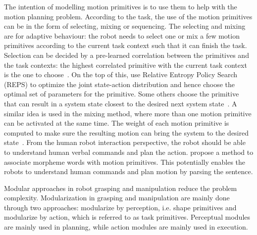 The intention of modelling motion primitives is to use them to help with the motion planning problem. According to the task, the use of the motion primitives can be in the form of selecting, mixing or sequencing. The selecting and mixing are for adaptive behaviour: the robot needs to select one or mix a few motion primitives according to the current task context such that it can finish the task.
Selection can be decided by a pre-learned correlation between the primitives and the task contexts: the highest correlated primitive with the current task context is the one to choose~\citep{takano2006primitive}. On the top of this, \citet{daniel2013learning} use Relative Entropy Policy Search (REPS) to optimize the joint state-action distribution and hence choose the optimal set of parameters for the primitive.
Some others choose the primitive that can result in a system state closest to the desired next system state~\citep{hauser2008using}. A similar idea is used in the mixing method, where more than one motion primitive can be activated at the same time. The weight of each motion primitive is computed to make sure the resulting motion can bring the system to the desired state~\citep{bidan2013robio,sugimoto2012emosaic}. From the human robot interaction perspective, the robot should be able to understand human verbal commands and plan the action. \citet{takano2008integrating} propose a method to associate morpheme words with motion primitives. This potentially enables the robots to understand human commands and plan motion by parsing the sentence.






Modular approaches in robot grasping and manipulation reduce the problem complexity. Modularization in grasping and manipulation are mainly done through two approaches: modularize by perception, i.e. shape primitives and modularize by action, which is referred to as task primitives. Perceptual modules are mainly used in planning, while action modules are mainly used in execution.

